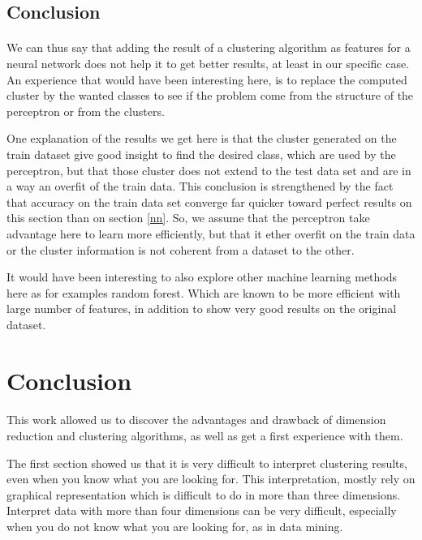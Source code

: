 \documentclass[twocolumn,a4paper,10pt]{article}
\begin{document}
\subsection{Conclusion}
\paragraph{}
We can thus say that adding the result of a clustering algorithm as features for a neural network does not help it to get better results, at least in our specific case. An experience that would have been interesting here, is to replace the computed cluster by the wanted classes to see if the problem come from the structure of the perceptron or from the clusters.

One explanation of the results we get here is that the cluster generated on the train dataset give good insight to find the desired class, which are used by the perceptron, but that those cluster does not extend to the test data set and are in a way an overfit of the train data. This conclusion is strengthened by the fact that accuracy on the train data set converge far quicker toward perfect results on this section than on section \ref{nn}. So, we assume that the perceptron take advantage here to learn more efficiently, but that it ether overfit on the train data or the cluster information is not coherent from a dataset to the other.

It would have been interesting to also explore other machine learning methods here as for examples random forest. Which are known to be more efficient with large number of features, in addition to show very good results on the original dataset.


\section{Conclusion}
\paragraph{}
This work allowed us to discover the advantages and drawback of dimension reduction and clustering algorithms, as well as get a first experience with them.

The first section showed us that it is very difficult to interpret clustering results, even when you know what you are looking for. This interpretation, mostly rely on graphical representation which is difficult to do in more than three dimensions. Interpret data with more than four dimensions can be very difficult, especially when you do not know what you are looking for, as in data mining.
\end{document}
